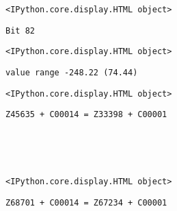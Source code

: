 \documentclass[11pt]{article}
\begin{document}
    
    \begin{verbatim}
<IPython.core.display.HTML object>
    \end{verbatim}

    
    \begin{Verbatim}[commandchars=\\\{\}]
Bit 82

    \end{Verbatim}

    
    \begin{verbatim}
<IPython.core.display.HTML object>
    \end{verbatim}

    
    \begin{Verbatim}[commandchars=\\\{\}]
value range -248.22 (74.44)

    \end{Verbatim}

    
    \begin{verbatim}
<IPython.core.display.HTML object>
    \end{verbatim}

    
    \begin{Verbatim}[commandchars=\\\{\}]
Z45635 + C00014 = Z33398 + C00001

    \end{Verbatim}

    \begin{center}
    \end{center}
    { \hspace*{\fill} \\}
    
    \begin{center}
    \end{center}
    { \hspace*{\fill} \\}
    
    
    \begin{verbatim}
<IPython.core.display.HTML object>
    \end{verbatim}

    
    \begin{Verbatim}[commandchars=\\\{\}]
Z68701 + C00014 = Z67234 + C00001

    \end{Verbatim}
\end{document}
